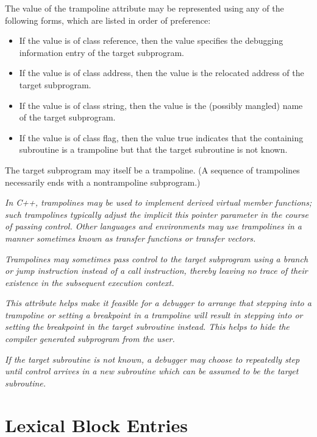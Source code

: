 The value of the trampoline attribute may be represented
using any of the following forms, which are listed in order
of preference:

\begin{itemize}
\item If the value is of class reference, then the value
specifies the debugging information entry of the target
subprogram.

\item If the value is of class address, then the value is
the relocated address of the target subprogram.

\item If the value is of class string, then the value is the
(possibly mangled) name of the target subprogram.

\item If the value is of class flag, then the value true
indicates that the containing subroutine is a trampoline but
that the target subroutine is not known.
\end{itemize}


The target subprogram may itself be a trampoline. (A sequence
of trampolines necessarily ends with a non\dash trampoline
subprogram.)

\textit{In C++, trampolines may be used to implement derived virtual
member functions; such trampolines typically adjust the
implicit this pointer parameter in the course of passing
control.  Other languages and environments may use trampolines
in a manner sometimes known as transfer functions or transfer
vectors.}

\textit{Trampolines may sometimes pass control to the target
subprogram using a branch or jump instruction instead of a
call instruction, thereby leaving no trace of their existence
in the subsequent execution context. }

\textit{This attribute helps make it feasible for a debugger to arrange
that stepping into a trampoline or setting a breakpoint in
a trampoline will result in stepping into or setting the
breakpoint in the target subroutine instead. This helps to
hide the compiler generated subprogram from the user. }

\textit{If the target subroutine is not known, a debugger may choose
to repeatedly step until control arrives in a new subroutine
which can be assumed to be the target subroutine. }



\section{Lexical Block Entries}
\label{chap:lexicalblockentries}

